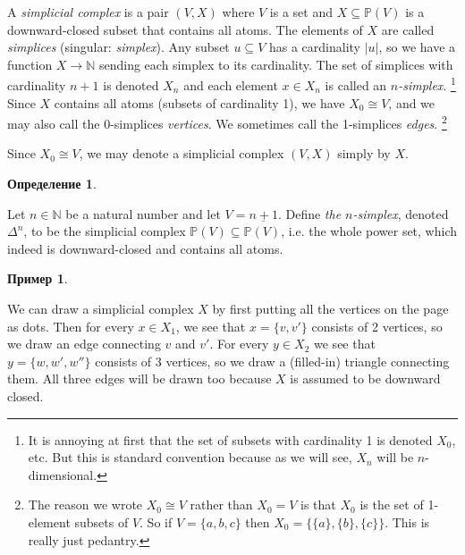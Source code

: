 \documentclass[a4paper]{book}
\def\PP{{\mathbb P}}
\def\NN{{\mathbb N}}
\def\to{\rightarrow}
\def\ss{\subseteq}
\def\iso{\cong}
\def\ul{\underline}
\theoremstyle{myth}
\newtheorem{exampleENG}[envENG]{\begin{english}Example\end{english}}
\newtheorem{definitionENG}[envENG]{\begin{english}Definition\end{english}}
\newtheorem{exampleRUS}[envRUS]{Пример}
\newtheorem{definitionRUS}[envRUS]{Определение}
\begin{document}
\begin{russian}
\begin{definitionENG}
A {\em simplicial complex} is a pair $(V,X)$ where $V$ is a set and $X\ss\PP(V)$ is a downward-closed subset that contains all atoms. The elements of $X$ are called {\em simplices} (singular: {\em simplex}). Any subset $u\ss V$ has a cardinality $|u|$, so we have a function $X\to\NN$ sending each simplex to its cardinality. The set of simplices with cardinality $n+1$ is denoted $X_n$ and each element $x\in X_n$ is called an {\em $n$-simplex}.%
\footnote{It is annoying at first that the set of subsets with cardinality 1 is denoted $X_0$, etc. But this is standard convention because as we will see, $X_n$ will be $n$-dimensional.}
Since $X$ contains all atoms (subsets of cardinality 1), we have $X_0\iso V$, and we may also call the 0-simplices {\em vertices}. We sometimes call the 1-simplices {\em edges}.%
\footnote{The reason we wrote $X_0\iso V$ rather than $X_0=V$ is that $X_0$ is the set of 1-element subsets of $V$. So if $V=\{a,b,c\}$ then $X_0=\{\{a\},\{b\},\{c\}\}$. This is really just pedantry.}

Since $X_0\iso V$, we may denote a simplicial complex $(V,X)$ simply by $X$.
\end{definitionENG}

\begin{definitionRUS}\label{def:simplicial complex}
 
\end{definitionRUS}

\begin{exampleENG}
Let $n\in\NN$ be a natural number and let $V=\ul{n+1}$. Define {\em the $n$-simplex}, denoted $\Delta^n$, to be the simplicial complex $\PP(V)\ss\PP(V)$, i.e. the whole power set, which indeed is downward-closed and contains all atoms. 
\end{exampleENG}

\begin{exampleRUS}
 
\end{exampleRUS}

We can draw a simplicial complex $X$ by first putting all the vertices on the page as dots. Then for every $x\in X_1$, we see that $x=\{v,v'\}$ consists of 2 vertices, so we draw an edge connecting $v$ and $v'$. For every $y\in X_2$ we see that $y=\{w,w',w''\}$ consists of 3 vertices, so we draw a (filled-in) triangle connecting them. All three edges will be drawn too because $X$ is assumed to be downward closed.

 


\end{russian}
\end{document}
